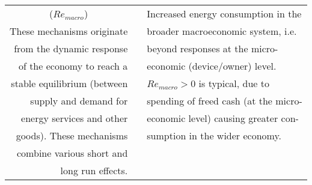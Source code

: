\begin{table}
\begin{center}
\begin{tabular}{ r l l }
\multicolumn{1}{c}{($Re_{macro}$)} &                                              & Increased energy consumption in the  \\
These mechanisms originate         &                                              & broader macroeconomic system, i.e.\  \\
from the dynamic response          &                                              & beyond responses at the micro-  \\
of the economy to reach a          &                                              & economic (device/owner) level. \\
stable equilibrium (between        &                                              & $Re_{macro} > 0$ is typical, due to   \\
supply and demand for              &                                              & spending of freed cash (at the micro-\\
energy services and other          &                                              & economic level) causing greater con- \\
goods). These mechanisms           &                                              & sumption in the wider economy. \\
combine various short and          &                                              &  \\
long run effects.                  &                                              &  \\
\bottomrule
\end{tabular}
\end{center}
\end{table}